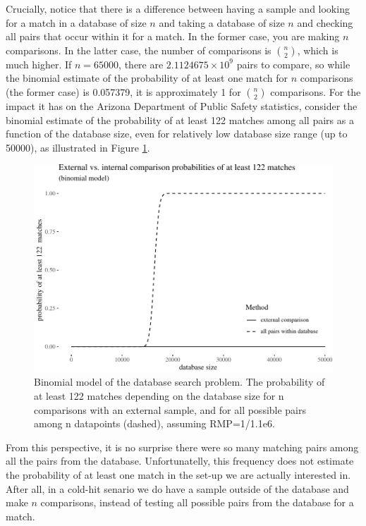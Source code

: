 \documentclass[10pt,dvipsnames,enabledeprecatedfontcommands]{scrartcl}
\begin{document}
Crucially, notice that there is a difference between having a sample and
looking for a match in a database of size \(n\) and taking a database of
size \(n\) and checking all pairs that occur within it for a match. In
the former case, you are making \(n\) comparisons. In the latter case,
the number of comparisons is \({n \choose 2}\), which is much higher. If
\(n=65000\), there are \ensuremath{2.1124675\times 10^{9}} pairs to
compare, so while the binomial estimate of the probability of at least
one match for \(n\) comparisons (the former case) is 0.057379, it is
approximately 1 for \({n \choose 2}\) comparisons. For the impact it has
on the Arizona Department of Public Safety statistics, consider the
binomial estimate of the probability of at least 122 matches among all
pairs as a function of the database size, even for relatively low
database size range (up to 50000), as illustrated in Figure
\ref{fig:Arizona}.

\begin{figure}[h]

\begin{center}\includegraphics[width=1\linewidth]{lr-chapter3_files/figure-latex/fig-Arizona-1} \end{center}
\caption{Binomial model of the database search problem. The probability of at least 122 matches depending on the database size for n comparisons with an external sample, and for all possible pairs among n datapoints (dashed), assuming RMP=1/1.1e6.}
\label{fig:Arizona}
\end{figure}

From this perspective, it is no surprise there were so many matching
pairs among all the pairs from the database. Unfortunatelly, this
frequency does not estimate the probability of at least one match in the
set-up we are actually interested in. After all, in a cold-hit senario
we do have a sample outside of the database and make \(n\) comparisons,
instead of testing all possible pairs from the database for a match.
\end{document}
